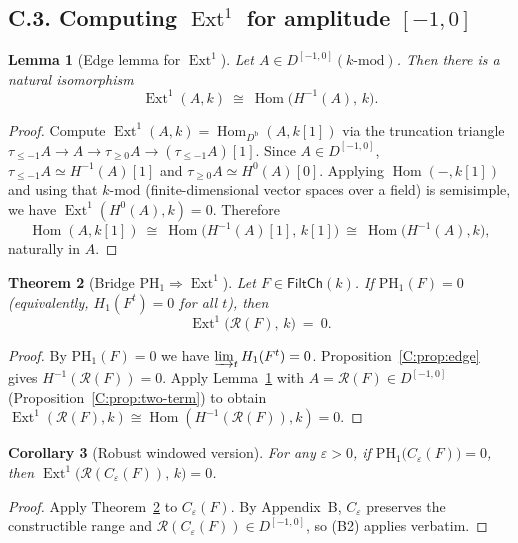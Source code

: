 \documentclass[11pt]{article}
\DeclareMathOperator{\Ext}{Ext}
\DeclareMathOperator{\Hom}{Hom}
\numberwithin{equation}{section}
\newtheorem{theorem}{Theorem}[section]
\newtheorem{lemma}[theorem]{Lemma}
\newtheorem{corollary}[theorem]{Corollary}
\theoremstyle{definition}
\begin{document}
\subsection*{C.3. Computing \texorpdfstring{$\Ext^1$}{Ext1} for amplitude \([-1,0]\)}

\begin{lemma}[Edge lemma for \(\Ext^1\)]\label{C:lem:edge-ext}
Let \(A\in D^{[-1,0]}(k\text{-mod})\).
Then there is a natural isomorphism
\[
\Ext^1(A,k)\ \cong\ \Hom\!\big(H^{-1}(A),\,k\big).
\]
\end{lemma}

\begin{proof}
Compute \(\Ext^1(A,k)=\Hom_{D^{\mathrm{b}}}(A,k[1])\) via the truncation triangle
\(\tau_{\le -1}A\to A\to \tau_{\ge 0}A\to (\tau_{\le -1}A)[1]\).
Since \(A\in D^{[-1,0]}\), \(\tau_{\le -1}A\simeq H^{-1}(A)[1]\) and \(\tau_{\ge 0}A\simeq H^{0}(A)[0]\).
Applying \(\Hom(-,k[1])\) and using that \(k\text{-mod}\) (finite-dimensional vector spaces over a field) is semisimple, we have \(\Ext^1(H^{0}(A),k)=0\).
Therefore
\[
\Hom(A,k[1])\ \cong\ \Hom\!\big(H^{-1}(A)[1],\,k[1]\big)\ \cong\ \Hom\!\big(H^{-1}(A),k\big),
\]
naturally in \(A\).
\end{proof}

\begin{theorem}[Bridge \(\mathrm{PH}_1\Rightarrow \Ext^1\)]\label{C:thm:bridge}
Let \(F\in \mathsf{FiltCh}(k)\).
If \(\mathrm{PH}_1(F)=0\) (equivalently, \(H_1(F^t)=0\) for all \(t\)), then
\[
\Ext^1\!\big(\mathcal{R}(F),\,k\big)\ =\ 0.
\]
\end{theorem}

\begin{proof}
By \(\mathrm{PH}_1(F)=0\) we have \(\varinjlim_t H_1(F^t)=0\).
Proposition~\ref{C:prop:edge} gives \(H^{-1}(\mathcal{R}(F))=0\).
Apply Lemma~\ref{C:lem:edge-ext} with \(A=\mathcal{R}(F)\in D^{[-1,0]}\) (Proposition~\ref{C:prop:two-term}) to obtain
\(\Ext^1(\mathcal{R}(F),k)\cong \Hom(H^{-1}(\mathcal{R}(F)),k)=0\).
\end{proof}

\begin{corollary}[Robust windowed version]
For any \(\varepsilon>0\), if \(\mathrm{PH}_1\!\big(C_\varepsilon(F)\big)=0\), then
\(\Ext^1\!\big(\mathcal{R}(C_\varepsilon(F)),\,k\big)=0\).
\end{corollary}

\begin{proof}
Apply Theorem~\ref{C:thm:bridge} to \(C_\varepsilon(F)\).
By Appendix~B, \(C_\varepsilon\) preserves the constructible range and \(\mathcal{R}(C_\varepsilon(F))\in D^{[-1,0]}\), so \textup{(B2)} applies verbatim.
\end{proof}
\end{document}
